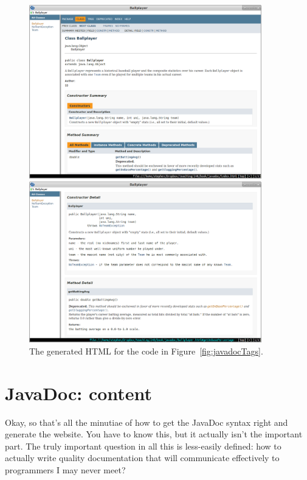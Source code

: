 \begin{figure}
\centering
\includegraphics[width=0.9\textwidth]{javadoc1.png}

\vspace{.1in}

\includegraphics[width=0.9\textwidth]{javadoc2.png}

\vspace{.1in}

\caption{The generated HTML for the code in Figure~\ref{fig:javadocTags}.}
\label{fig:javadocApi}
\end{figure}


\section{JavaDoc: content}

Okay, so that's all the minutiae of how to get the JavaDoc syntax right and
generate the website. You have to know this, but it actually isn't the
important part. The truly important question in all this is less-easily
defined: how to actually write quality documentation that will communicate
effectively to programmers I may never meet?

